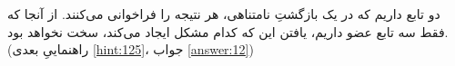 \section{}
\paragraph{}\label{hint:53}
دو تابع داریم که در یک بازگشتِ نامتناهی، هر نتیجه را فراخوانی می‌کنند. از آنجا که فقط سه تابع عضو داریم، یافتن این که کدام مشکل ایجاد می‌کند، سخت نخواهد بود. (راهنماییِ بعدی \ref{hint:125}، جواب \ref{answer:12})